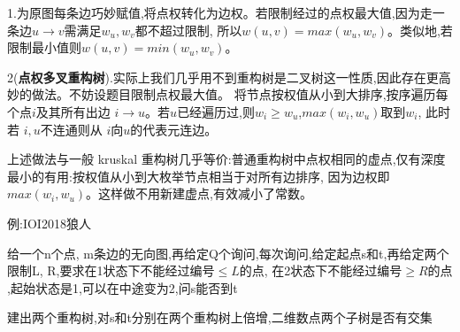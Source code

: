\documentclass[a4paper, fontset=none]{ctexart}
\begin{document}
1.为原图每条边巧妙赋值,将点权转化为边权。若限制经过的点权最大值,因为走一条边$u\rightarrow v$需满足$w_u, w_v$都不超过限制,
所以$w(u, v)=max(w_u, w_v)$。类似地,若限制最小值则$w(u, v)=min(w_u, w_v)$。

2(\textbf{点权多叉重构树}).实际上我们几乎用不到重构树是二叉树这一性质,因此存在更高妙的做法。不妨设题目限制点权最大值。
将节点按权值从小到大排序,按序遍历每个点$i$及其所有出边 $i\rightarrow u$。若$u$已经遍历过,则$w_i\ge w_u$,$max(w_i, w_u)$取到$w_i$,
此时若 $i, u$不连通则从 $i$向$u$的代表元连边。

上述做法与一般 kruskal 重构树几乎等价:普通重构树中点权相同的虚点,仅有深度最小的有用:按权值从小到大枚举节点相当于对所有边排序,
因为边权即 $max(w_i, w_u)$。这样做不用新建虚点,有效减小了常数。

例:IOI2018狼人

给一个n个点, m条边的无向图,再给定Q个询问,每次询问,给定起点s和t,再给定两个限制L, R,要求在1状态下不能经过编号$\leqslant L$的点,
在2状态下不能经过编号$\ge R$的点 ,起始状态是1,可以在中途变为2,问s能否到t

建出两个重构树,对s和t分别在两个重构树上倍增,二维数点两个子树是否有交集
\end{document}
